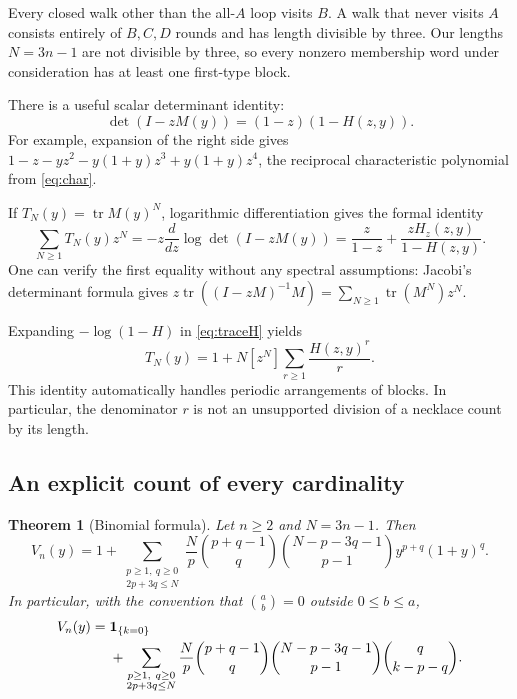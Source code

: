 \documentclass[11pt,a4paper]{article}
\newtheorem{theorem}{Theorem}[section]
\theoremstyle{definition}
\newcommand{\tr}{\operatorname{tr}}
\begin{document}
Every closed walk other than the all-$A$ loop visits $B$. A walk that never
visits $A$ consists entirely of $B,C,D$ rounds and has length divisible by
three. Our lengths $N=3n-1$ are not divisible by three, so every nonzero
membership word under consideration has at least one first-type block.

There is a useful scalar determinant identity:
\begin{equation}
 \det(I-zM(y))=(1-z)(1-H(z,y)).
 \label{eq:detH}
\end{equation}
For example, expansion of the right side gives
$1-z-yz^2-y(1+y)z^3+y(1+y)z^4$, the reciprocal characteristic
polynomial from \cref{eq:char}.

If $T_N(y)=\tr M(y)^N$, logarithmic differentiation gives the formal identity
\begin{equation}
 \sum_{N\ge1}T_N(y)z^N
 =-z\frac{d}{dz}\log\det(I-zM(y))
 =\frac{z}{1-z}+\frac{zH_z(z,y)}{1-H(z,y)}.
 \label{eq:traceH}
\end{equation}
One can verify the first equality without any spectral assumptions:
Jacobi's determinant formula gives
$z\tr((I-zM)^{-1}M)=\sum_{N\ge1}\tr(M^N)z^N$.

Expanding $-\log(1-H)$ in \cref{eq:traceH} yields
\begin{equation}
 T_N(y)=1+N[z^N]\sum_{r\ge1}\frac{H(z,y)^r}{r}.
 \label{eq:logsum}
\end{equation}
This identity automatically handles periodic arrangements of blocks. In
particular, the denominator $r$ is not an unsupported division of a necklace
count by its length.

\subsection{An explicit count of every cardinality}

\begin{theorem}[Binomial formula]
\label{thm:binomial}
Let $n\ge2$ and $N=3n-1$. Then
\begin{equation}
 V_n(y)=1+
 \sum_{\substack{p\ge1,\ q\ge0\\2p+3q\le N}}
 \frac{N}{p}
 \binom{p+q-1}{q}
 \binom{N-p-3q-1}{p-1}
 y^{p+q}(1+y)^q.
 \label{eq:binomial}
\end{equation}
In particular, with the convention that $\binom ab=0$ outside $0\le b\le a$,
\begin{align}
 [y^k]V_n(y)={}&\boldsymbol{1}_{\{k=0\}}\notag\\
 &+\sum_{\substack{p\ge1,\ q\ge0\\2p+3q\le N}}
 \frac{N}{p}\binom{p+q-1}{q}
 \binom{N-p-3q-1}{p-1}
 \binom q{k-p-q}.
 \label{eq:cardinality}
\end{align}
\end{theorem}
\end{document}
